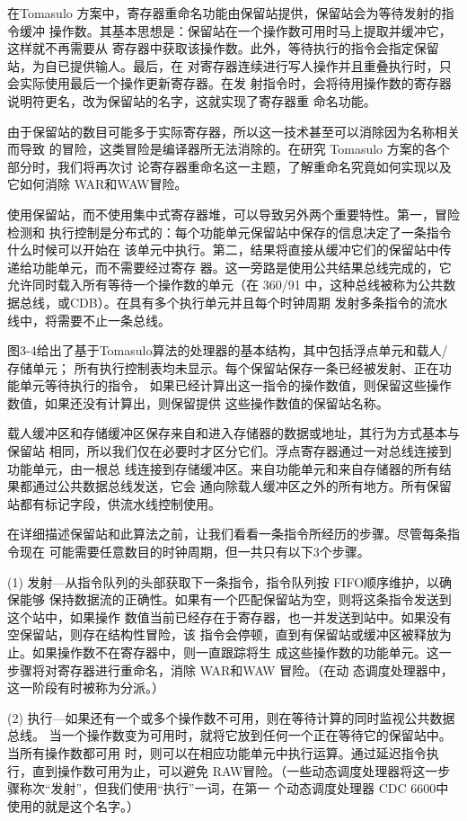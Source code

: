 在Tomasulo 方案中，寄存器重命名功能由保留站提供，保留站会为等待发射的指令缓冲
操作数。其基本思想是：保留站在一个操作数可用时马上提取并缓冲它，这样就不再需要从
寄存器中获取该操作数。此外，等待执行的指令会指定保留站，为自已提供输人。最后，在
对寄存器连续进行写人操作并且重叠执行时，只会实际使用最后一个操作更新寄存器。在发
射指令时，会将待用操作数的寄存器说明符更名，改为保留站的名字，这就实现了寄存器重
命名功能。

由于保留站的数目可能多于实际寄存器，所以这一技术甚至可以消除因为名称相关而导致
的冒险，这类冒险是编译器所无法消除的。在研究 Tomasulo 方案的各个部分时，我们将再次讨
论寄存器重命名这一主题，了解重命名究竟如何实现以及它如何消除 WAR和WAW冒险。

使用保留站，而不使用集中式寄存器堆，可以导致另外两个重要特性。第一，冒险检测和
执行控制是分布式的：每个功能单元保留站中保存的信息决定了一条指令什么时候可以开始在
该单元中执行。第二，结果将直接从缓冲它们的保留站中传递给功能单元，而不需要经过寄存
器。这一旁路是使用公共结果总线完成的，它允许同时载入所有等待一个操作数的单元（在
360/91 中，这种总线被称为公共数据总线，或CDB）。在具有多个执行单元并且每个时钟周期
发射多条指令的流水线中，将需要不止一条总线。

图3-4给出了基于Tomasulo算法的处理器的基本结构，其中包括浮点单元和载人/存储单元；
所有执行控制表均未显示。每个保留站保存一条已经被发射、正在功能单元等待执行的指令，
如果已经计算出这一指令的操作数值，则保留这些操作数值，如果还没有计算出，则保留提供
这些操作数值的保留站名称。

载人缓冲区和存储缓冲区保存来自和进入存储器的数据或地址，其行为方式基本与保留站
相同，所以我们仅在必要时才区分它们。浮点寄存器通过一对总线连接到功能单元，由一根总
线连接到存储缓冲区。来自功能单元和来自存储器的所有结果都通过公共数据总线发送，它会
通向除载人缓冲区之外的所有地方。所有保留站都有标记字段，供流水线控制使用。

在详细描述保留站和此算法之前，让我们看看一条指令所经历的步骤。尽管每条指令现在
可能需要任意数目的时钟周期，但一共只有以下3个步骤。

(1) 发射—从指令队列的头部获取下一条指令，指令队列按 FIFO顺序维护，以确保能够
保持数据流的正确性。如果有一个匹配保留站为空，则将这条指令发送到这个站中，如果操作
数值当前已经存在于寄存器，也一并发送到站中。如果没有空保留站，则存在结构性冒险，该
指令会停顿，直到有保留站或缓冲区被释放为止。如果操作数不在寄存器中，则一直跟踪将生
成这些操作数的功能单元。这一步骤将对寄存器进行重命名，消除 WAR和WAW 冒险。（在动
态调度处理器中，这一阶段有时被称为分派。）

(2) 执行—如果还有一个或多个操作数不可用，则在等待计算的同时监视公共数据总线。
当一个操作数变为可用时，就将它放到任何一个正在等待它的保留站中。当所有操作数都可用
时，则可以在相应功能单元中执行运算。通过延迟指令执行，直到操作数可用为止，可以避免
RAW冒险。（一些动态调度处理器将这一步骤称次“发射”，但我们使用“执行”一词，在第一
个动态调度处理器 CDC 6600中使用的就是这个名字。）

